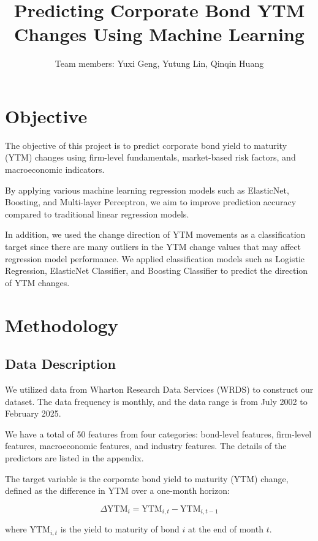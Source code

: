 \documentclass[12pt]{article}
\title{\textbf{Predicting Corporate Bond YTM Changes Using Machine Learning}}
\author{Team members: Yuxi Geng, Yutung Lin, Qinqin Huang}
\date{}
\begin{document}
\maketitle

\section{Objective}

The objective of this project is to predict corporate bond yield to maturity (YTM) changes using firm-level fundamentals, market-based risk factors, and macroeconomic indicators.

By applying various machine learning regression models such as ElasticNet, Boosting, and Multi-layer Perceptron, we aim to improve prediction accuracy compared to traditional linear regression models.

In addition, we used the change direction of YTM movements as a classification target since there are many outliers in the YTM change values that may affect regression model performance. We applied classification models such as Logistic Regression, ElasticNet Classifier, and Boosting Classifier to predict the direction of YTM changes.

\section{Methodology}

\subsection{Data Description}

We utilized data from Wharton Research Data Services (WRDS) to construct our dataset. The data frequency is monthly, and the data range is from July 2002 to February 2025.

We have a total of 50 features from four categories: bond-level features, firm-level features, macroeconomic features, and industry features. The details of the predictors are listed in the appendix.

The target variable is the corporate bond yield to maturity (YTM) change, defined as the difference in YTM over a one-month horizon:

\begin{equation}
\Delta \text{YTM}_i = \text{YTM}_{i,t} - \text{YTM}_{i,t-1}
\end{equation}

where $\text{YTM}_{i,t}$ is the yield to maturity of bond $i$ at the end of month $t$.
\end{document}
